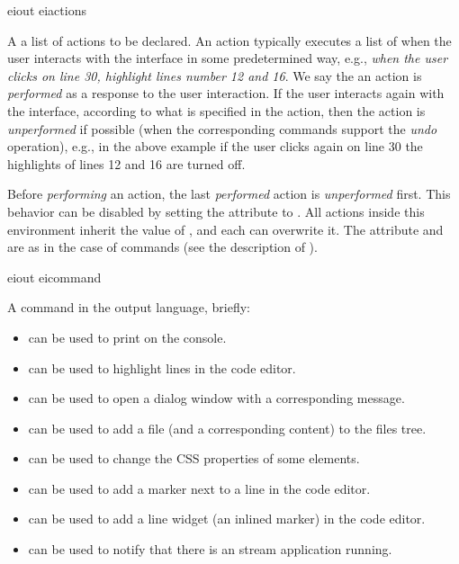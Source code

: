 \bigskip
\xmlstruct
{eiout}
{eiactions}
{%
%
  A a list of actions to be declared. An action typically executes a
  list of  when the user interacts with the
  interface in some predetermined way, e.g., \emph{when the user
    clicks on line 30, highlight lines number 12 and 16}. We say the
  an action is \emph{performed} as a response to the user interaction.
%
  If the user interacts again with the interface, according to what is
  specified in the action, then the action is \emph{unperformed} if
  possible (when the corresponding commands support the \emph{undo}
  operation), e.g., in the above example if the user clicks again on
  line 30 the highlights of lines 12 and 16 are turned off.

  Before \emph{performing} an action, the last \emph{performed} action
  is \emph{unperformed} first. This behavior can be disabled by
  setting the  attribute to
  . All actions inside this environment
  inherit the value of , and each can
  overwrite it.
% 
  The attribute  and  are
  as in the case of commands (see the description of
  ).
%
}


\bigskip
\xmlstruct
{eiout}
{eicommand}
{
A command in the \ei output language, briefly:
\begin{itemize}
\item {} can be used to print on the console.
%
\item {} can be used to highlight
  lines in the code editor.
%
\item {} can be used to open a dialog
  window with a corresponding message.
%
\item {} can be used to add a file (and a
  corresponding content) to the files tree.
%
\item {} can be used to change the CSS
  properties of some elements.
%
\item {} can be used to add a marker next
  to a line in the code editor.
%
\item {} can be used to add a line
  widget (an inlined marker) in the code editor.
%
\item {} can be used to notify that
  there is an stream application running.
%
\end{itemize}
}


